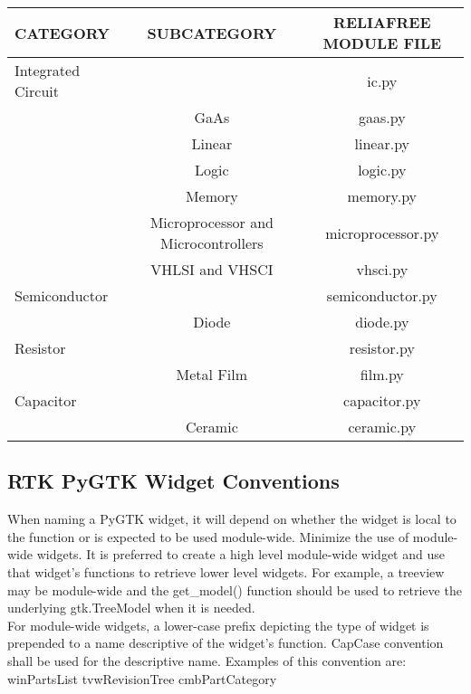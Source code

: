 \documentclass[11pt, 12pt, twoside, onecolumn]{article}
\begin{document}
    \begin{landscape}
    \begin{longtable}{lcc}
    CATEGORY & SUBCATEGORY & RELIAFREE MODULE FILE \\
    \hline
    Integrated Circuit & & ic.py \\
    & GaAs & gaas.py \\
    & Linear & linear.py \\
    & Logic & logic.py \\
    & Memory & memory.py \\
    & Microprocessor and Microcontrollers & microprocessor.py \\
    & VHLSI and VHSCI & vhsci.py \\
    \hline
    Semiconductor & & semiconductor.py \\
    & Diode & diode.py \\
    \hline
    Resistor & & resistor.py \\
    & Metal Film & film.py \\
    \hline
    Capacitor & & capacitor.py \\
    & Ceramic & ceramic.py \\
    \hline
    \end{longtable}
    \end{landscape}

\noindent

\subsection{\bf \large RTK PyGTK Widget Conventions}

\noindent When naming a PyGTK widget, it will depend on whether the widget is local to the function or is expected to be used module-wide.  Minimize the use of module-wide widgets.  It is preferred to create a high level module-wide widget and use that widget's functions to retrieve lower level widgets.  For example, a treeview may be module-wide and the get\_model() function should be used to retrieve the underlying gtk.TreeModel when it is needed. \\

\noindent For module-wide widgets, a lower-case prefix depicting the type of widget is prepended to a name descriptive of the widget's function.  CapCase convention shall be used for the descriptive name.  Examples of this convention are: \\

    winPartsList
    tvwRevisionTree
    cmbPartCategory
\end{document}
